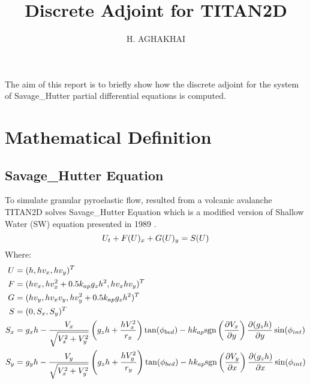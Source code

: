 \documentclass[a4paper,10pt]{article}
\title{Discrete Adjoint for TITAN2D}
\author{H. AGHAKHAI}
\date{}
\begin{document}
\maketitle
\tableofcontents
% 
% 
\newpage

The aim of this report is to briefly show how the discrete adjoint for the system of Savage\_Hutter partial differential equations 
is computed. 
\section{Mathematical Definition}
\subsection{Savage\_Hutter Equation}
To simulate granular pyroelastic flow, resulted from a volcanic avalanche TITAN2D solves Savage\_Hutter Equation which is a modified version of Shallow Water (SW) equation presented in 1989 \cite{SavageHutter1989}.
\begin{equation}
 \large{U_t + F(U)_x + G(U)_y = S(U)}
\end{equation}
Where:
\begin{displaymath}
\begin{aligned}
U & = (h, hv_x, hv_y)^T \\
F & = (hv_x, hv_x^2+0.5k_{ap}g_zh^2, hv_xhv_y)^T \\
G & = (hv_y, hv_xv_y, hv_y^2+0.5k_{ap}g_zh^2)^T \\
S & = (0, S_x, S_y)^T \\
S_x & = g_x h  - \frac{V_x}{\sqrt{V_x^2+V_y^2}}\left(g_z h+\frac{hV_x^2}{r_x}\right)\tan(\phi_{bed})
 - h k_{ap}{\rm sgn}\left({\frac{\partial V_x}{\partial y}}\right) \frac{\partial (g_zh)}{\partial y} \sin(\phi_{int})\\
S_y & = g_y h  - \frac{V_y}{\sqrt{V_x^2+V_y^2}}\left(g_z h+\frac{hV_y^2}{r_y}\right)\tan(\phi_{bed})
 - h k_{ap}{\rm sgn}\left({\frac{\partial V_y}{\partial x}}\right) \frac{\partial (g_zh)}{\partial x} \sin(\phi_{int})
\end{aligned}
\end{displaymath}
\end{document}
